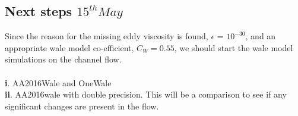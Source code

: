 \documentclass[a4paper]{article}
\begin{document}
\subsection{Next steps $15^{th} May$}

Since the reason for the missing eddy viscosity is found, $\epsilon$ = $10^{-30}$, and an appropriate wale model co-efficient, $C_{W} = 0.55$, we should start the wale model simulations on the channel flow.
\\
\\
{\bf i}. AA2016Wale and OneWale\\
{\bf ii}. AA2016wale with double precision. This will be a comparison to see if any significant changes are present in the flow. 


%
%
\end{document}
